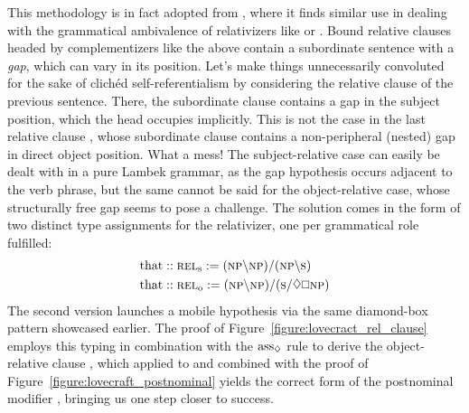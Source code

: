 This methodology is in fact adopted from \citet{moortgat1999constants}, where it finds similar use in dealing with the grammatical ambivalence of relativizers like  or .
Bound relative clauses headed by complementizers like the above contain a subordinate sentence with a \textit{gap}, which can vary in its position.
Let's make things unnecessarily convoluted for the sake of clich{\'e}d self-referentialism by considering the relative clause  of the previous sentence.
There, the subordinate clause  contains a gap in the subject position, which the head  occupies implicitly.
This is not the case in the last relative clause , whose subordinate clause  contains a non-peripheral (nested) gap in direct object position.
What a mess! 
The subject-relative case can easily be dealt with in a pure Lambek grammar, as the gap hypothesis occurs adjacent to the verb phrase, but
the same cannot be said for the object-relative case, whose structurally free gap seems to pose a challenge.
The solution comes in the form of two distinct type assignments for the relativizer, one per grammatical role fulfilled:
\begin{align}
	\w{that} &:: \subcat{l}{rel}{s} := (\np\divleft\np)\divright(\np\divleft\s)\\
	\w{that} &:: \subcat{l}{rel}{o} := (\np\divleft\np)\divright(\s\divright\diamond\bx \np ) \label{equation:objrel}
\end{align}
The second version launches a mobile \np[s] hypothesis via the same diamond-box pattern showcased earlier.
The proof of Figure~\ref{figure:lovecract_rel_clause} employs this typing in combination with the $\rulestyle{ass}_{\diamond}$ rule to derive the object-relative clause , which applied to  and combined with the proof of Figure~\ref{figure:lovecraft_postnominal} yields the correct form of the postnominal modifier , bringing us one step closer to success.

